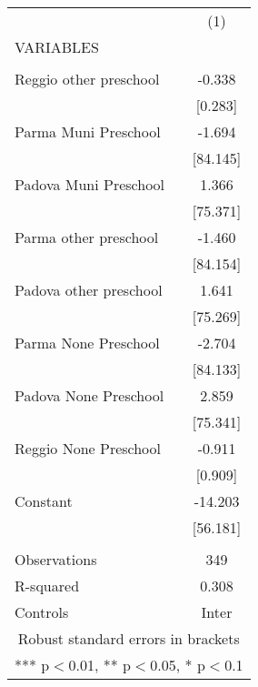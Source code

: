 \begin{tabular}{lc} \hline
 & (1) \\
VARIABLES &  \\ \hline
 &  \\
Reggio other preschool & -0.338 \\
 & [0.283] \\
Parma Muni Preschool & -1.694 \\
 & [84.145] \\
Padova Muni Preschool & 1.366 \\
 & [75.371] \\
Parma other preschool & -1.460 \\
 & [84.154] \\
Padova other preschool & 1.641 \\
 & [75.269] \\
Parma None Preschool & -2.704 \\
 & [84.133] \\
Padova None Preschool & 2.859 \\
 & [75.341] \\
Reggio None Preschool & -0.911 \\
 & [0.909] \\
Constant & -14.203 \\
 & [56.181] \\
 &  \\
Observations & 349 \\
R-squared & 0.308 \\
 Controls & Inter \\ \hline
\multicolumn{2}{c}{ Robust standard errors in brackets} \\
\multicolumn{2}{c}{ *** p$<$0.01, ** p$<$0.05, * p$<$0.1} \\
\end{tabular}
